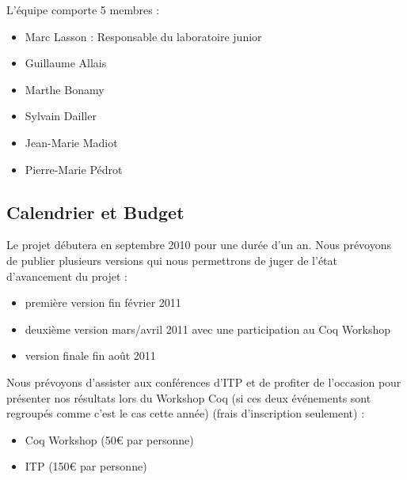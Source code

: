 \documentclass[11pt]{article}
\begin{document}
L'équipe comporte 5 membres :

\begin{itemize}
 \item Marc Lasson : Responsable du laboratoire junior
 \item Guillaume Allais
 \item Marthe Bonamy
 \item Sylvain Dailler
 \item Jean-Marie Madiot
 \item Pierre-Marie Pédrot
\end{itemize}

\subsection{Calendrier et Budget}

Le projet débutera en septembre 2010 pour une durée d'un an.
Nous prévoyons de publier plusieurs versions qui nous permettrons de juger de l'état d'avancement du projet : 
\begin{itemize}
\item première version fin février 2011
\item deuxième version mars/avril 2011 avec une participation au Coq Workshop
\item version finale fin août 2011
\end{itemize}

Nous prévoyons d'assister aux conférences d'ITP et de profiter de l'occasion pour présenter nos résultats lors du Workshop Coq (si ces deux événements sont regroupés comme c'est le cas cette année) (frais d'inscription seulement) :
\begin{itemize}
	\item Coq Workshop (50€ par personne)
	\item ITP (150€ par personne) 
\end{itemize}

\printbibliography
\end{document}
